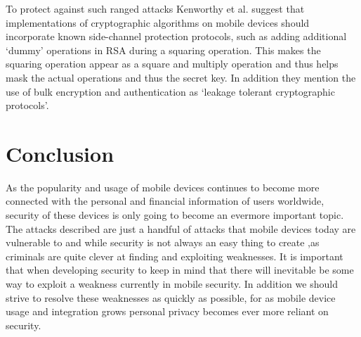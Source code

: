 \documentclass{sig-alternate}
\begin{document}
 To protect against such ranged attacks Kenworthy et al. suggest that implementations of cryptographic algorithms on mobile devices should incorporate known side-channel protection protocols, such as adding additional `dummy' operations in RSA during a squaring operation. This makes the squaring operation appear as a square and multiply operation and thus helps mask the actual operations and thus the secret key. In addition they mention the use of bulk encryption and authentication as `leakage tolerant cryptographic protocols'.      
\section{Conclusion}
As the popularity and usage of mobile devices continues to become more connected with the personal and financial information of users worldwide, security of these devices is only going to become an evermore important topic. The attacks described are just a handful of attacks that mobile devices today are vulnerable to and while security is not always an easy thing to create ,as criminals are quite clever at finding and exploiting weaknesses. It is important that when developing security to keep in mind that there will inevitable be some way to exploit a weakness currently in mobile security. In addition we should strive to resolve these weaknesses as quickly as possible, for as mobile device usage and integration grows personal privacy becomes ever more reliant on security.     

 

\end{document}
